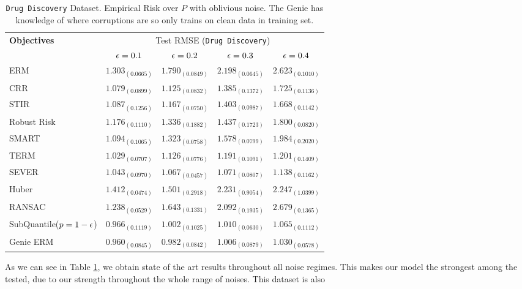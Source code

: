 \documentclass{article} %
\newcommand{\subhead}[1]{\multicolumn{1}{c}{#1}}%
\begin{document}
	\begin{table}[!h]
		\centering
		\begin{tabular}{lcccc}
			\toprule 
			\textbf{Objectives}&\multicolumn{4}{c}{Test RMSE (\texttt{Drug Discovery})}\\                   
			\cmidrule(rl){2-5}
			&\subhead{${\epsilon} = 0.1$}& \subhead{${\epsilon} = 0.2$}& \subhead{${\epsilon} = 0.3$}& \subhead{${\epsilon} = 0.4$}\\ 
			\midrule
			ERM  &$1.303_{(0.0665)}$&$1.790_{(0.0849)}$&$2.198_{(0.0645)}$&$2.623_{(0.1010)}$\\
			CRR \cite{bhatia2017}  &$1.079_{(0.0899)}$&$1.125_{(0.0832)}$&$1.385_{(0.1372)}$&$1.725_{(0.1136)}$\\
			STIR \cite{pmlr-v89-mukhoty19a} &$1.087_{(0.1256)}$&$1.167_{(0.0750)}$&$1.403_{(0.0987)}$&$1.668_{(0.1142)}$\\
			Robust Risk \cite{RRM} &$1.176_{(0.1110)}
			$&$1.336_{(0.1882)}$&$1.437_{(0.1723)}$&$1.800_{(0.0820)}$\\
			SMART \cite{https://doi.org/10.48550/arxiv.2206.04777} &$1.094_{(0.1065)}$&$1.323_{(0.0758)}$&$1.578_{(0.0799)}$&$1.984_{(0.2020)}$\\
			TERM \cite{li2020tilted} &$\mathbf{1.029_{(0.0707)}}$&$1.126_{(0.0776)}$&$1.191_{(0.1091)}$&$1.201_{(0.1409)}$\\
			SEVER \cite{DiakonikolasKKLSS19} &$1.043_{(0.0970)}$&$\mathbf{1.067_{(0.0457)}}$&$\mathbf{1.071_{(0.0807)}}$&$\mathbf{1.138_{(0.1162)}}$\\
			Huber \cite{Huber2009} &$1.412_{(0.0474)}$&$1.501_{(0.2918)}$&$2.231_{(0.9054)}$&$2.247_{(1.0399)}$\\
			RANSAC \cite{RANSAC1981} &$1.238_{(0.0529)}$&$1.643_{(0.1331)}$&$2.092_{(0.1935)}$&$2.679_{(0.1365)}$\\
			\rowcolor{LightCyan}
			SubQuantile($p = 1-{\epsilon}$) &$\mathbf{0.966_{(0.1119)}}$&$\mathbf{1.002_{(0.1025)}}$&$\mathbf{1.010_{(0.0630)}}$&$\mathbf{1.065_{(0.1112)}}$\\
			\midrule 
			Genie ERM &$0.960_{(0.0845)}$&$0.982_{(0.0842)}$&$1.006_{(0.0879)}$&$1.030_{(0.0578)}$\\
			\bottomrule
		\end{tabular}
		\caption{\texttt{Drug Discovery} Dataset. Empirical Risk over $P$ with oblivious noise. The Genie has knowledge of where corruptions are so only trains on clean data in training set.}
		\label{tab:drug-discovery}
	\end{table}
	
	As we can see in Table \ref{tab:drug-discovery}, we obtain state of the art results throughout all noise regimes. This makes our model the strongest among the tested, due to our strength throughout the whole range of noises. This dataset is also 
	
\end{document}
